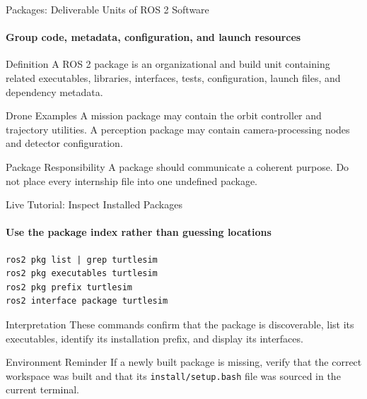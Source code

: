 \begin{frame}{Packages: Deliverable Units of ROS 2 Software}
\framesubtitle{Group code, metadata, configuration, and launch resources}
\begin{block}{Definition}
A ROS 2 package is an organizational and build unit containing related executables, libraries, interfaces, tests, configuration, launch files, and dependency metadata.
\end{block}
\begin{exampleblock}{Drone Examples}
A mission package may contain the orbit controller and trajectory utilities. A perception package may contain camera-processing nodes and detector configuration.
\end{exampleblock}
\begin{alertblock}{Package Responsibility}
A package should communicate a coherent purpose. Do not place every internship file into one undefined package.
\end{alertblock}
\end{frame}

\begin{frame}[fragile]{Live Tutorial: Inspect Installed Packages}
\framesubtitle{Use the package index rather than guessing locations}
\begin{verbatim}
ros2 pkg list | grep turtlesim
ros2 pkg executables turtlesim
ros2 pkg prefix turtlesim
ros2 interface package turtlesim
\end{verbatim}
\begin{exampleblock}{Interpretation}
These commands confirm that the package is discoverable, list its executables, identify its installation prefix, and display its interfaces.
\end{exampleblock}
\begin{alertblock}{Environment Reminder}
If a newly built package is missing, verify that the correct workspace was built and that its \texttt{install/setup.bash} file was sourced in the current terminal.
\end{alertblock}
\end{frame}

